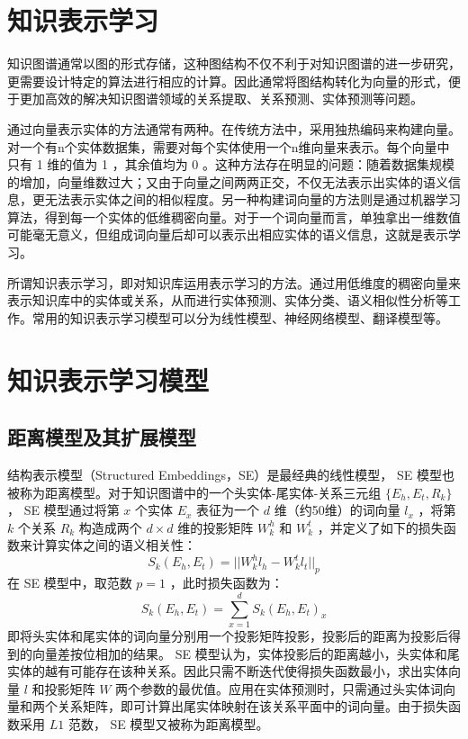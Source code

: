 \documentclass{llncs}
\begin{document}
\section{知识表示学习}

知识图谱通常以图的形式存储，这种图结构不仅不利于对知识图谱的进一步研究，更需要设计特定的算法进行相应的计算。因此通常将图结构转化为向量的形式，便于更加高效的解决知识图谱领域的关系提取、关系预测、实体预测等问题。

通过向量表示实体的方法通常有两种。在传统方法中，采用独热编码来构建向量。对一个有n个实体数据集，需要对每个实体使用一个n维向量来表示。每个向量中只有 1 维的值为 1 ，其余值均为 0 。这种方法存在明显的问题：随着数据集规模的增加，向量维数过大；又由于向量之间两两正交，不仅无法表示出实体的语义信息，更无法表示实体之间的相似程度。另一种构建词向量的方法则是通过机器学习算法，得到每一个实体的低维稠密向量。对于一个词向量而言，单独拿出一维数值可能毫无意义，但组成词向量后却可以表示出相应实体的语义信息，这就是表示学习。

所谓知识表示学习，即对知识库运用表示学习的方法。通过用低维度的稠密向量来表示知识库中的实体或关系，从而进行实体预测\cite{DBLP:journals/tkde/WangMWG17}、实体分类、语义相似性分析等工作。常用的知识表示学习模型可以分为线性模型、神经网络模型、翻译模型等。

\section{知识表示学习模型}

\subsection{距离模型及其扩展模型}

结构表示模型（Structured Embeddings，SE）\cite{DBLP:conf/aaai/BordesWCB11,DBLP:journals/corr/abs-1301-3618}是最经典的线性模型， SE 模型也被称为距离模型。对于知识图谱中的一个头实体-尾实体-关系三元组 $\{E_h, E_t, R_k\}$ ， SE 模型通过将第 $x$ 个实体 $E_x$ 表征为一个 $d$ 维（约50维）的词向量 $l_x$ ，将第 $k$ 个关系 $R_k$ 构造成两个 $d×d$ 维的投影矩阵 $W^h_k$ 和 $W^t_k$ ，并定义了如下的损失函数来计算实体之间的语义相关性：
\begin{displaymath}
S_k(E_h,E_t)=||W^h_kl_h-W^t_kl_t||_p
\end{displaymath}
在 SE 模型中，取范数 $p=1$ ，此时损失函数为：
\begin{displaymath}
S_k(E_h,E_t)=\sum_{x=1}^d{S_k(E_h,E_t)_x}
\end{displaymath}
即将头实体和尾实体的词向量分别用一个投影矩阵投影，投影后的距离为投影后得到的向量差按位相加的结果。 SE 模型认为，实体投影后的距离越小，头实体和尾实体的越有可能存在该种关系。因此只需不断迭代使得损失函数最小，求出实体向量 $l$ 和投影矩阵 $W$ 两个参数的最优值。应用在实体预测时，只需通过头实体词向量和两个关系矩阵，即可计算出尾实体映射在该关系平面中的词向量。由于损失函数采用 $L1$ 范数， SE 模型又被称为距离模型。
\end{document}
